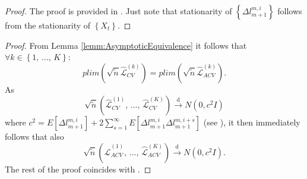 \documentclass[11pt,dvipsnames]{article}
\newtheorem{proof}{Proof of Proposition}
\begin{document}
\begin{appendices}
\begin{proof}
The proof is provided in \citet{zhuCanTwoForecasts2020}. Just note that stationarity of $ \left\lbrace \Delta l_{m+1}^{m,i} \right\rbrace  $ follows from the stationarity of $ \left\lbrace X_{t} \right\rbrace  $.
\end{proof}


\begin{proof}
From Lemma \ref{lemm:AsymptoticEquivalence} it follows that $ \forall k \in \left\lbrace 1,\,...,\,K\right\rbrace $:
\begin{equation}
plim\left(\sqrt{\tilde{n}}\widehat{\mathcal{L}}_{CV}^{(k)}\right) = plim\left(\sqrt{\tilde{n}}\widehat{\mathcal{L}}_{ACV}^{(k)}\right) .
\end{equation}
As
\begin{equation}
\sqrt{\tilde{n}}\left( \widehat{\mathcal{L}}_{CV}^{(1)},\,...,\,\widehat{\mathcal{L}}_{CV}^{(K)}\right) \overset{\mathrm{d}}{\longrightarrow} N(0,c^{2}I)
\end{equation}
where $ c^{2}= E[\Delta l_{m+1}^{m,i}]+ 2\sum_{s=1}^{\infty} E[\Delta l_{m+1}^{m,i}\Delta l_{m+1}^{m,i+s}] $ (see \citet{zhuCanTwoForecasts2020}), it then immediately follows that also
\begin{equation}
\sqrt{\tilde{n}}\left( \widehat{\mathcal{L}}_{ACV}^{(1)},\,...,\,\widehat{\mathcal{L}}_{ACV}^{(K)}\right) \overset{\mathrm{d}}{\longrightarrow} N(0,c^{2}I).
\end{equation}
The rest of the proof coincides with \citet{zhuCanTwoForecasts2020}.
\end{proof}






\end{appendices}
\end{document}
